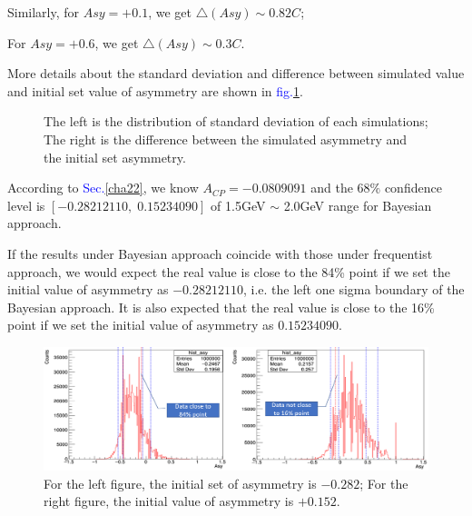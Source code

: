 \documentclass[a4paper,12pt]{article}
\begin{document}
Similarly, for $Asy=+0.1$, we get $\triangle\left(Asy\right)\sim0.82C$;

For $Asy=+0.6$, we get $\triangle\left(Asy\right)\sim0.3C$.

More details about the standard deviation and difference between simulated value and initial set value of asymmetry are shown in \textcolor{blue}{fig.\ref{details_std}}.
\begin{figure}[htbp]
\centering
{}
\quad
{}
\caption{The left is the distribution of standard deviation of each simulations; The right is the difference between the simulated asymmetry and the initial set asymmetry.}
\label{details_std}
\end{figure}

According to \textcolor{blue}{Sec.\ref{cha22}}, we know  $A_{CP} = -0.0809091$ and the $68\%$ confidence level is $\left[-0.28212110,\;0.15234090\right]$ of 1.5GeV $\sim$ 2.0GeV range for Bayesian approach. 

If the results under Bayesian approach coincide with those under frequentist approach, we would expect the real value is close to the 84\% point if we set the initial value of asymmetry as $-0.28212110$, i.e. the left one sigma boundary of the Bayesian approach. It is also expected that the real value is close to the 16\% point if we set the initial value of asymmetry as $0.15234090$.  

\begin{figure}[H]
    \centering
    \includegraphics[width=12cm]{Images/nearRange.png}
    \caption{For the left figure, the initial set of asymmetry is $-0.282$; For the right figure, the initial value of asymmetry is $+0.152$.}
    \label{twoRanges}
\end{figure} 
\end{document}
